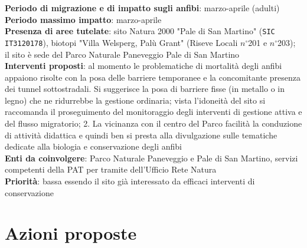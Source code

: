 \documentclass[11pt,a4paper,twoside]{memoir}
\begin{document}
\textbf{Periodo di migrazione e di impatto sugli anfibi}: marzo-aprile (adulti) \\
\textbf{Periodo massimo impatto}: marzo-aprile \\
\textbf{Presenza di aree tutelate}: sito Natura 2000 "Pale di San Martino" (\texttt{SIC IT3120178}), biotopi "Villa Welsperg, Palù Grant" (Riseve Locali $n^{\circ}$201 e $n^{\circ}$203); il sito è sede del Parco Naturale Paneveggio Pale di San Martino \\
\textbf{Interventi proposti}: al momento le problematiche di mortalità degli anfibi appaiono risolte con la posa delle barriere temporanee e la concomitante presenza dei tunnel sottostradali. Si suggerisce la posa di barriere fisse (in metallo o in legno) che ne ridurrebbe la gestione ordinaria; vista l’idoneità del sito si raccomanda il proseguimento del monitoraggio degli interventi di gestione attiva e del flusso migratorio; 2. La vicinanza con il centro del Parco facilità la conduzione di attività didattica e quindi ben si presta alla divulgazione sulle tematiche dedicate alla biologia e conservazione degli anfibi \\
\textbf{Enti da coinvolgere}: Parco Naturale Paneveggio e Pale di San Martino, servizi competenti della PAT per tramite dell’Ufficio Rete Natura \\
\textbf{Priorità}: bassa essendo il sito già interessato da efficaci interventi di conservazione \\


\chapter{Azioni proposte}
\label{chap:actions}
\end{document}
